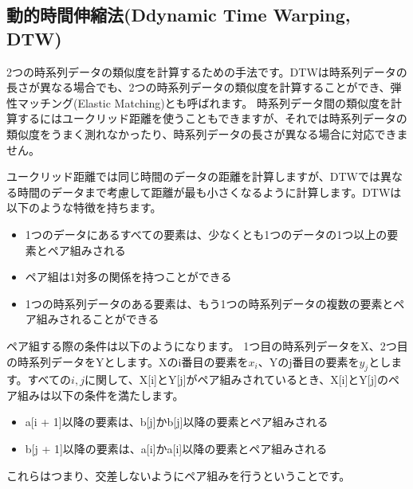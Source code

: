 \subsection{動的時間伸縮法(Ddynamic Time Warping, DTW)}
2つの時系列データの類似度を計算するための手法です。DTWは時系列データの長さが異なる場合でも、2つの時系列データの類似度を計算することができ、弾性マッチング(Elastic Matching)とも呼ばれます。
時系列データ間の類似度を計算するにはユークリッド距離を使うこともできますが、それでは時系列データの類似度をうまく測れなかったり、時系列データの長さが異なる場合に対応できません。

\begin{center}
\end{center}

\vspace{0.5cm}

ユークリッド距離では同じ時間のデータの距離を計算しますが、DTWでは異なる時間のデータまで考慮して距離が最も小さくなるように計算します。DTWは以下のような特徴を持ちます。

\begin{itemize}
  \item 1つのデータにあるすべての要素は、少なくとも1つのデータの1つ以上の要素とペア組みされる
  \item ペア組は1対多の関係を持つことができる
  \item 1つの時系列データのある要素は、もう1つの時系列データの複数の要素とペア組みされることができる
\end{itemize}

ペア組する際の条件は以下のようになります。
1つ目の時系列データをX、2つ目の時系列データをYとします。Xのi番目の要素を$x_i$、Yのj番目の要素を$y_j$とします。すべての$i, j$に関して、X[i]とY[j]がペア組みされているとき、X[i]とY[j]のペア組みは以下の条件を満たします。
\begin{itemize}
  \item a[i + 1]以降の要素は、b[j]かb[j]以降の要素とペア組みされる
  \item b[j + 1]以降の要素は、a[i]かa[i]以降の要素とペア組みされる
\end{itemize}

これらはつまり、交差しないようにペア組みを行うということです。